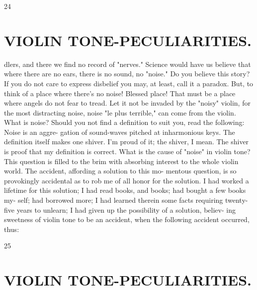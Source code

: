 \documentclass{article}
\begin{document}
24

\section*{VIOLIN TONE-PECULIARITIES.}
dlers, and there we find no record of "nerves." Science would have us believe that where there are no ears, there is no sound, no "noise." Do you believe this story? If you do not care to express disbelief you may, at least, call it a paradox. But, to think of a place where there's no noise! Blessed place! That must be a place where angels do not fear to tread. Let it not be invaded by the "noisy" violin, for the most distracting noise, noise "le plus terrible," can come from the violin. What is noise? Should you not find a definition to suit you, read the following: Noise is an aggre- gation of sound-waves pitched at inharmonious keys. The definition itself makes one shiver. I'm proud of it; the shiver, I mean. The shiver is proof that my definition is correct. What is the cause of "noise" in violin tone? This question is filled to the brim with absorbing interest to the whole violin world. The accident, affording a solution to this mo- mentous question, is so provokingly accidental as to rob me of all honor for the solution. I had worked a lifetime for this solution; I had read books, and books; had bought a few books my- self; had borrowed more; I had learned therein some facts requiring twenty-five years to unlearn; I had given up the possibility of a solution, believ- ing sweetness of violin tone to be an accident, when the following accident occurred, thus:

25

\section*{VIOLIN TONE-PECULIARITIES.}
\end{document}
